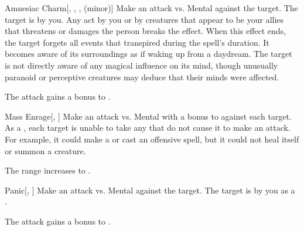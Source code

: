 \lowercase{\hypertarget{spell:Amnesiac Charm}{}}\label{spell:Amnesiac Charm}
\begin{freeability}[Rank 6]{\hypertarget{spell:Amnesiac Charm}{Amnesiac Charm}}[, , ,  (minor)]
Make an attack vs. Mental against the target.
\hit The target is \charmed by you.
Any act by you or by creatures that appear to be your allies that threatens or damages the  person breaks the effect.
When this effect ends, the target forgets all events that transpired during the spell's duration.
It becomes aware of its surroundings as if waking up from a daydream.
The target is not directly aware of any magical influence on its mind, though unusually paranoid or perceptive creatures may deduce that their minds were affected.

\rankline
{} The attack gains a  bonus to .
\end{freeability}
\vspace{0.25em}



\lowercase{\hypertarget{spell:Mass Enrage}{}}\label{spell:Mass Enrage}
\begin{freeability}[Rank 6]{\hypertarget{spell:Mass Enrage}{Mass Enrage}}[, ]
Make an attack vs. Mental with a  bonus to  against each target.
\hit As a , each target is unable to take any  that do not cause it to make an attack.
For example, it could make a  or cast an offensive spell, but it could not heal itself or summon a creature.

\rankline
{} The range increases to \rnglong.
\end{freeability}
\vspace{0.25em}



\lowercase{\hypertarget{spell:Panic}{}}\label{spell:Panic}
\begin{freeability}[Rank 6]{\hypertarget{spell:Panic}{Panic}}[, ]
Make an attack vs. Mental against the target.
\hit The target is \panicked by you as a .

\rankline
{} The attack gains a  bonus to .
\end{freeability}
\vspace{0.25em}


